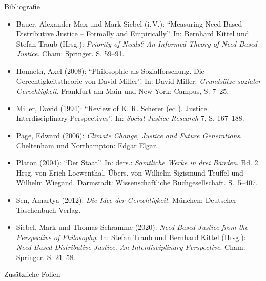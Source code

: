 \documentclass[xcolor=table,9pt,aspectratio=169]{beamer}
\begin{document}
\begin{frame}{\vspace*{10mm}Bibliografie}
\vspace*{-10mm}
{\footnotesize
\begin{itemize}[label=,leftmargin=2em,itemindent=-2em]
   \item Bauer, Alexander Max und Mark Siebel (i.\,V.): \enquote{Measuring Need-Based Distributive Justice -- Formally and Empirically}. In: Bernhard Kittel und Stefan Traub (Hrsg.): \textit{Priority of Needs? An Informed Theory of Need-Based Justice}. Cham: Springer. S. 59--91.
   \item Honneth, Axel (2008): \enquote{Philosophie als Sozialforschung. Die Gerechtigkeitstheorie von David Miller}. In: David Miller: \textit{Grundsätze sozialer Gerechtigkeit}. Frankfurt am Main und New York: Campus, S. 7--25.
   \item Miller, David (1994): \enquote{Review of K. R. Scherer (ed.). Justice. Interdisciplinary Perspectives}. In: \textit{Social Justice Research} 7, S. 167--188.
   \item Page, Edward (2006): \textit{Climate Change, Justice and Future Generations}. Cheltenham und Northampton: Edgar Elgar.
   \item Platon (2004): \enquote{Der Staat}. In: ders.: \textit{Sämtliche Werke in drei Bänden}. Bd. 2. Hrsg. von Erich Loewenthal. Übers. von Wilhelm Sigismund Teuffel und Wilhelm Wiegand. Darmstadt: Wissenschaftliche Buchgesellschaft. S.~5--407.
   \item Sen, Amartya (2012): \textit{Die Idee der Gerechtigkeit}. München: Deutscher Taschenbuch Verlag.
   \item Siebel, Mark und Thomas Schramme (2020): \textit{Need-Based Justice from the Perspective of Philosophy}. In: Stefan Traub und Bernhard Kittel (Hrsg.): \textit{Need-Based Distributive Justice. An Interdisciplinary Perspective}. Cham: Springer. S. 21--58.
\end{itemize}
}
\end{frame}


\begin{frame}
\begin{overlayarea}{\textwidth}{0.81\paperheight}{
   \vspace*{11mm}
   \textcolor{uolblue}
   {Zusätzliche Folien}
}
\end{overlayarea}
\end{frame}
\end{document}
